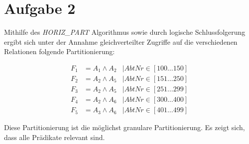 \documentclass[11pt,a4paper]{scrartcl}
\begin{document}
\section{Aufgabe 2}

Mithilfe des \emph{HORIZ\_PART} Algorithmus sowie durch logische
Schlussfolgerung ergibt sich unter der Annahme gleichverteilter Zugriffe auf die
verschiedenen Relationen folgende Partitionierung:

\begin{align*}
  F_1 &= A_1 \wedge A_2 & | AbtNr \in \left[100 \ldots 150\right]\\
  F_2 &= A_2 \wedge A_5 & | AbtNr \in \left[151 \ldots 250\right]\\
  F_3 &= A_2 \wedge A_5 & | AbtNr \in \left[251 \ldots 299\right]\\
  F_4 &= A_2 \wedge A_6 & | AbtNr \in \left[300 \ldots 400\right]\\
  F_5 &= A_3 \wedge A_6 & | AbtNr \in \left[401 \ldots 499\right]
\end{align*}

Diese Partitionierung ist die möglichst granulare Partitionierung.  Es zeigt
sich, dass alle Prädikate relevant sind.
\end{document}
